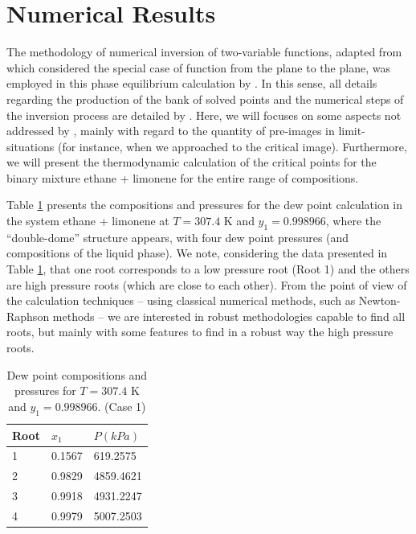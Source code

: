 \documentclass[journal=iecred,manuscript=article]{achemso}
\theoremstyle{definition}
\theoremstyle{remark}
\begin{document}
\section{Numerical Results}

The methodology of numerical inversion of two-variable functions, adapted from \citet{malta} which considered the special case of function from the plane to the plane,
 was employed in this phase equilibrium calculation by \citet{ireme}. In this sense, all details regarding the production of the bank of solved points and the numerical steps of the inversion process are detailed by \citet{ireme}. Here, we will focuses on some aspects not addressed by \citet{ireme}, mainly with regard
 to the quantity of pre-images in  limit-situations (for instance, when we approached to the critical image). Furthermore, we will present the thermodynamic calculation of the critical points for the binary mixture ethane + limonene for the entire range of compositions.
 
Table \ref{tab:roots_double_dome} presents the compositions and pressures for the dew point calculation in the system ethane + limonene at $T = 307.4$ K and $y_1 = 0.998966$, where the \enquote{double-dome} structure appears, with four dew point pressures (and compositions of the liquid phase). We note, considering the data presented in Table \ref{tab:roots_double_dome}, that one root corresponds to a low pressure root (Root 1) and the others are high pressure roots (which are close to each other). From the point of view of the calculation techniques -- using classical numerical methods, such as Newton-Raphson methods -- we are interested in robust methodologies capable to find all roots, but mainly with some features to find in a robust way the high pressure roots.

\begin{table}
  \caption{Dew point compositions and pressures for $T = 307.4$ K and $y_1 = 0.998966$. (Case 1)}
  \label{tab:roots_double_dome}
  \begin{tabular}{lll}
  \hline
    Root & $ x_{1} $ & $ P \left( kPa \right) $ \\
    \hline
    1 & 0.1567 & 619.2575 \\
    2 & 0.9829 & 4859.4621 \\
    3 & 0.9918 & 4931.2247 \\
    4 & 0.9979 & 5007.2503 \\
    \hline
  \end{tabular}
\end{table}
\end{document}
